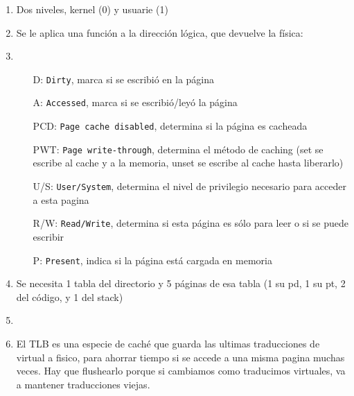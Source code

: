 \begin{enumerate}
\item Dos niveles, kernel (0) y usuarie (1)
\item Se le aplica una función a la dirección lógica, que devuelve la física: \\
\item \begin{itemize}
  \item[D:] \texttt{Dirty}, marca si se escribió en la página
  \item[A:] \texttt{Accessed}, marca si se escribió/leyó la página
  \item[PCD:] \texttt{Page cache disabled}, determina si la página es cacheada
  \item[PWT:] \texttt{Page write-through}, determina el método de caching (set se escribe al cache y a la memoria, unset se escribe al cache hasta liberarlo)
  \item[U/S:] \texttt{User/System}, determina el nivel de privilegio necesario para acceder a esta pagina
  \item[R/W:] \texttt{Read/Write}, determina si esta página es sólo para leer o si se puede escribir
  \item[P:] \texttt{Present}, indica si la página está cargada en memoria
  \end{itemize}
\item Se necesita 1 tabla del directorio y 5 páginas de esa tabla (1 su pd, 1 su pt, 2 del código, y 1 del stack)
\item
\item El TLB es una especie de caché que guarda las ultimas traducciones de virtual a fisico, para ahorrar tiempo si se accede a una misma pagina muchas veces. Hay que flushearlo porque si cambiamos como traducimos virtuales, va a mantener traducciones viejas.
\end{enumerate}
